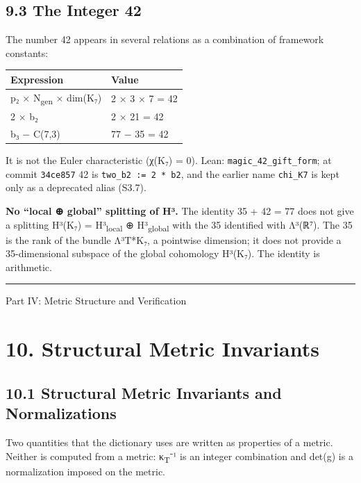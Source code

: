 \documentclass[11pt,a4paper]{article}
\begin{document}
\subsection{9.3 The Integer 42}\label{the-integer-42}

The number 42 appears in several relations as a combination of framework constants:

\begin{longtable}[]{@{}ll@{}}
\toprule\noalign{}
Expression & Value \\
\midrule\noalign{}
\endhead
\bottomrule\noalign{}
\endlastfoot
p₂ × N\textsubscript{gen} × dim(K₇) & 2 × 3 × 7 = 42 \\
2 × b₂ & 2 × 21 = 42 \\
b₃ − C(7,3) & 77 − 35 = 42 \\
\end{longtable}

It is not the Euler characteristic (χ(K₇) = 0). Lean: \texttt{magic\_\allowbreak{}42\_\allowbreak{}gift\_\allowbreak{}form}; at commit \texttt{34ce857} 42 is \texttt{two\_\allowbreak{}b2\ :=\ 2\ *\ b2}, and the earlier name \texttt{chi\_\allowbreak{}K7} is kept only as a deprecated alias (S3.7).

\textbf{No ``local ⊕ global'' splitting of H³.} The identity 35 + 42 = 77 does not give a splitting H³(K₇) = H³\textsubscript{local} ⊕ H³\textsubscript{global} with the 35 identified with Λ³(ℝ⁷). The 35 is the rank of the bundle Λ³T*K₇, a pointwise dimension; it does not provide a 35-dimensional subspace of the global cohomology H³(K₇). The identity is arithmetic.

\begin{center}\rule{\linewidth}{0.5pt}\end{center}

Part IV: Metric Structure and Verification

\section{10. Structural Metric Invariants}\label{structural-metric-invariants}

\subsection{10.1 Structural Metric Invariants and Normalizations}\label{structural-metric-invariants-and-normalizations}

Two quantities that the dictionary uses are written as properties of a metric. Neither is computed from a metric: κ\textsubscript{T}⁻¹ is an integer combination and det(g) is a normalization imposed on the metric.
\end{document}
